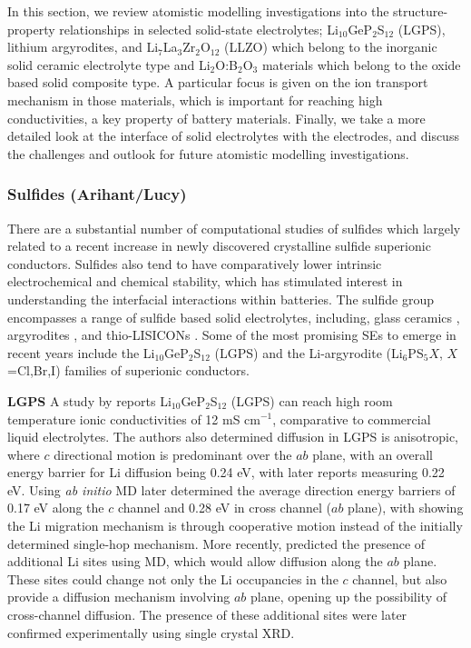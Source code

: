 \documentclass[../main.tex]{subfiles}
\begin{document}
In this section, we review atomistic modelling investigations into the structure-property relationships in selected solid-state electrolytes; Li$_{10}$GeP$_2$S$_{12}$ (LGPS), lithium argyrodites, and Li$_7$La$_3$Zr$_2$O$_{12}$ (LLZO) which belong to the inorganic solid ceramic electrolyte type and Li$_{2}$O:B$_{2}$O$_{3}$ materials which belong to the oxide based solid composite type. A particular focus is given on the ion transport mechanism in those materials, which is important for reaching high conductivities, a key property of battery materials. Finally, we take a more detailed look at the interface of solid electrolytes with the electrodes, and discuss the challenges and outlook for future atomistic modelling investigations.

\subsubsection{Sulfides (Arihant/Lucy)}
There are a substantial number of computational studies of sulfides which largely related to a recent increase in newly discovered crystalline sulfide superionic conductors. Sulfides also tend to have comparatively lower intrinsic electrochemical and chemical stability, which has stimulated interest in understanding the interfacial interactions within batteries. \cite{Xiao2020interfacerev} The sulfide group encompasses a range of sulfide based solid electrolytes, including, glass ceramics \cite{minami2006recent}, argyrodites \cite{bai2020research}, and thio-LISICONs \cite{minafra2020two}. Some of the most promising SEs to emerge in recent years include the Li$_{10}$GeP$_2$S$_{12}$ (LGPS) \cite{Bhandari2016,Kamaya2011,Mo2012} and the Li-argyrodite (Li$_6$PS$_{5}X$, $X$=Cl,Br,I) \cite{kraft2018,deiseroth_li6ps5x_2008,deklerk2016,kraft2017,minafra2018,adeli2019} families of superionic conductors.

\textbf{LGPS}
A study by \citeauthor{Kamaya2011} reports Li$_{10}$GeP$_2$S$_{12}$ (LGPS) can reach high room temperature ionic conductivities of 12 mS cm$^{-1}$, comparative to commercial liquid electrolytes.\cite{Kamaya2011} The authors also determined diffusion in LGPS is anisotropic, where $c$ directional motion is predominant over the $ab$ plane, with an overall energy barrier for Li diffusion being 0.24 eV, with later reports measuring 0.22 eV.\cite{Kuhn2013b} Using \textit{ab initio} MD \citeauthor{Mo2012} later determined the average direction energy barriers of 0.17 eV along the $c$ channel and 0.28 eV in cross channel ($ab$ plane), \cite{Mo2012} with \citeauthor{Xu2012one} showing the Li migration mechanism is through cooperative motion instead of the initially determined single-hop mechanism.\cite{Xu2012one} More recently, \citeauthor{Adams2012} predicted the presence of additional Li sites using MD, which would allow diffusion along the $ab$ plane.\cite{Adams2012} These sites could change not only the Li occupancies in the $c$ channel, but also provide a diffusion mechanism involving $ab$ plane, opening up the possibility of cross-channel diffusion. The presence of these additional sites were later confirmed experimentally using single crystal XRD.\cite{Kuhn2013a}
\end{document}
